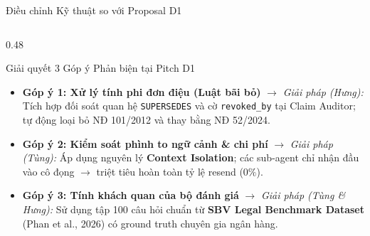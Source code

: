 \documentclass[aspectratio=169,10pt,xcolor={table}]{beamer}
\begin{document}
\begin{frame}{Điều chỉnh Kỹ thuật so với Proposal D1}
\begin{columns}[T]
\begin{column}{0.48\textwidth}
\begin{block}{\small Giải quyết 3 Góp ý Phản biện tại Pitch D1}
\footnotesize
\begin{itemize}
  \item \textbf{Góp ý 1: Xử lý tính phi đơn điệu (Luật bãi bỏ)}
    \newline $\to$ \textit{Giải pháp (Hưng):} Tích hợp đối soát quan hệ \texttt{SUPERSEDES} và cờ \texttt{revoked\_by} tại Claim Auditor; tự động loại bỏ NĐ 101/2012 và thay bằng NĐ 52/2024.
  \item \textbf{Góp ý 2: Kiểm soát phình to ngữ cảnh \& chi phí}
    \newline $\to$ \textit{Giải pháp (Tùng):} Áp dụng nguyên lý \textbf{Context Isolation}; các sub-agent chỉ nhận đầu vào cô đọng $\to$ triệt tiêu hoàn toàn tỷ lệ resend ($0\%$).
  \item \textbf{Góp ý 3: Tính khách quan của bộ đánh giá}
    \newline $\to$ \textit{Giải pháp (Tùng \& Hưng):} Sử dụng tập 100 câu hỏi chuẩn từ \textbf{SBV Legal Benchmark Dataset} (Phan et al., 2026) có ground truth chuyên gia ngân hàng.
\end{itemize}
\end{block}
\end{column}
\end{columns}
\end{frame}
\end{document}
